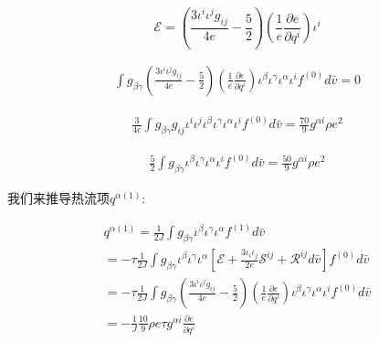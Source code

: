 \documentclass[LBMDerivation.tex]{subfiles}
\begin{document}
$$
  \mathcal{E}= (\frac{3 {\iota^i\iota^jg_{ij}}}{4e}-\frac{5}{2}) (\frac{1}{e}\frac{\partial e}{\partial q^i})\iota^i
$$



\begin{equation}
  \begin{gathered}
    \int g_{\beta\gamma} (\frac{3 {\iota^i\iota^jg_{ij}}}{4e}-\frac{5}{2}) (\frac{1}{e}\frac{\partial e}{\partial q^i})\iota^{\beta} \iota^{\gamma}  \iota^{\alpha} \iota^i   f^{(0)}  d \bar{v} =0
  \end{gathered}
\end{equation}



\begin{equation}
  \begin{gathered}
    \frac{3}{4e}\int g_{\beta\gamma} g_{ij} \iota^i\iota^j\iota^{\beta} \iota^{\gamma}  \iota^{\alpha} \iota^i   f^{(0)}  d \bar{v} =\frac{70}{9}g^{\alpha i}\rho e^2
  \end{gathered}
\end{equation}


\begin{equation}
  \begin{gathered}
    \frac{5}{2} \int g_{\beta\gamma} \iota^{\beta} \iota^{\gamma}  \iota^{\alpha} \iota^i   f^{(0)}  d \bar{v} =\frac{50}{9}g^{\alpha i}\rho e^2
  \end{gathered}
\end{equation}





我们来推导热流项$q^{\alpha (1)}$:


\begin{equation}
  \begin{gathered}
    q^{\alpha (1)} =  \frac{1}{2J}\int g_{\beta\gamma} \iota^{\beta} \iota^{\gamma}  \iota^{\alpha} f^{(1)}  d \bar{v}\\
    = -\tau  \frac{1}{2J}\int g_{\beta\gamma} \iota^{\beta} \iota^{\gamma}  \iota^{\alpha}  [ \mathcal{E}
      +\frac{3\iota_i \iota_j}{2e} \mathcal{S}^{ij}
      +  \mathcal{R}^{ij}  d \bar{v}
    ]{f^{(0)}} d \bar{v} \\
    = -\tau  \frac{1}{2J} \int g_{\beta\gamma} (\frac{3 {\iota^i\iota^jg_{ij}}}{4e}-\frac{5}{2}) (\frac{1}{e}\frac{\partial e}{\partial q^i})\iota^{\beta} \iota^{\gamma}  \iota^{\alpha} \iota^i   f^{(0)}  d \bar{v} \\
    = -\frac{1}{J}\frac{10}{9}\rho e \tau g^{\alpha i}\frac{\partial e}{\partial q^i}
  \end{gathered}
\end{equation}











\end{document}

